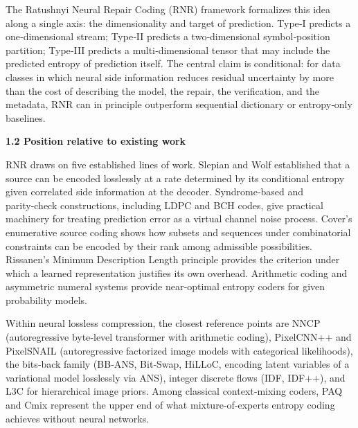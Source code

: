 \documentclass[
]{article}
\begin{document}
The Ratushnyi Neural Repair Coding (RNR) framework formalizes this idea
along a single axis: the dimensionality and target of prediction. Type‑I
predicts a one‑dimensional stream; Type‑II predicts a two‑dimensional
symbol‑position partition; Type‑III predicts a multi‑dimensional tensor
that may include the predicted entropy of prediction itself. The central
claim is conditional: for data classes in which neural side information
reduces residual uncertainty by more than the cost of describing the
model, the repair, the verification, and the metadata, RNR can in
principle outperform sequential dictionary or entropy‑only baselines.

\textbf{1.2 Position relative to existing work}

RNR draws on five established lines of work. Slepian and Wolf
established that a source can be encoded losslessly at a rate determined
by its conditional entropy given correlated side information at the
decoder. Syndrome‑based and parity‑check constructions, including LDPC
and BCH codes, give practical machinery for treating prediction error as
a virtual channel noise process. Cover's enumerative source coding shows
how subsets and sequences under combinatorial constraints can be encoded
by their rank among admissible possibilities. Rissanen's Minimum
Description Length principle provides the criterion under which a
learned representation justifies its own overhead. Arithmetic coding and
asymmetric numeral systems provide near‑optimal entropy coders for given
probability models.

Within neural lossless compression, the closest reference points are
NNCP (autoregressive byte‑level transformer with arithmetic coding),
PixelCNN++ and PixelSNAIL (autoregressive factorized image models with
categorical likelihoods), the bits‑back family (BB‑ANS, Bit‑Swap,
HiLLoC, encoding latent variables of a variational model losslessly via
ANS), integer discrete flows (IDF, IDF++), and L3C for hierarchical
image priors. Among classical context‑mixing coders, PAQ and Cmix
represent the upper end of what mixture‑of‑experts entropy coding
achieves without neural networks.
\end{document}
